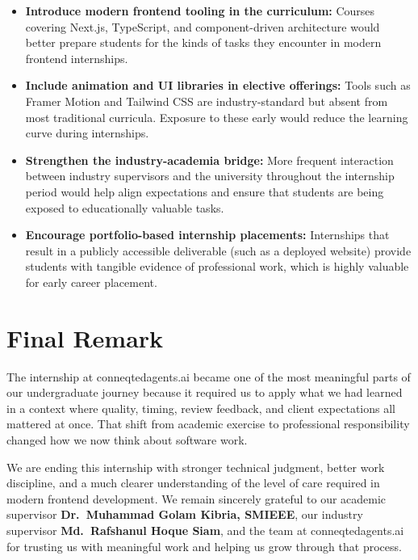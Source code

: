 \documentclass[12pt, oneside, a4paper]{book}
\begin{document}
\begin{doublespace}
\begin{itemize}
  \item \textbf{Introduce modern frontend tooling in the curriculum:} Courses
  covering Next.js, TypeScript, and component-driven architecture would better prepare
  students for the kinds of tasks they encounter in modern frontend internships.
  \item \textbf{Include animation and UI libraries in elective offerings:} Tools such
  as Framer Motion and Tailwind CSS are industry-standard but absent from most
  traditional curricula. Exposure to these early would reduce the learning curve
  during internships.
  \item \textbf{Strengthen the industry-academia bridge:} More frequent interaction
  between industry supervisors and the university throughout the internship period
  would help align expectations and ensure that students are being exposed to
  educationally valuable tasks.
  \item \textbf{Encourage portfolio-based internship placements:} Internships that
  result in a publicly accessible deliverable (such as a deployed website) provide
  students with tangible evidence of professional work, which is highly valuable for
  early career placement.
\end{itemize}

\section{Final Remark}

The internship at conneqtedagents.ai became one of the most meaningful parts of our
undergraduate journey because it required us to apply what we had learned in a context
where quality, timing, review feedback, and client expectations all mattered at once.
That shift from academic exercise to professional responsibility changed how we now think
about software work.

We are ending this internship with stronger technical judgment, better work discipline,
and a much clearer understanding of the level of care required in modern frontend
development. We remain sincerely grateful to our academic supervisor
\textbf{Dr.\ Muhammad Golam Kibria, SMIEEE}, our industry supervisor
\textbf{Md.\ Rafshanul Hoque Siam}, and the team at conneqtedagents.ai for trusting us
with meaningful work and helping us grow through that process.

\end{doublespace}
\end{document}
